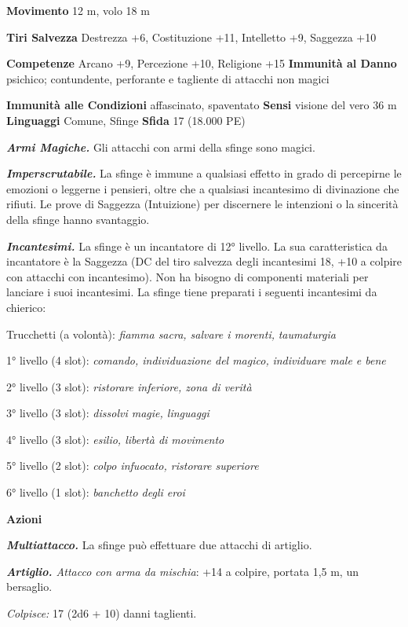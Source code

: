 \begin{multicols}{2}
\textbf{Movimento} 12 m, volo 18 m

\textbf{Tiri Salvezza} Destrezza +6, Costituzione +11, Intelletto +9,
Saggezza +10

\textbf{Competenze} Arcano +9, Percezione +10, Religione +15
\textbf{Immunità al Danno} psichico; contundente, perforante e tagliente
di attacchi non magici

\textbf{Immunità alle Condizioni} affascinato, spaventato \textbf{Sensi}
visione del vero 36 m \textbf{Linguaggi} Comune,
Sfinge \textbf{Sfida} 17 (18.000 PE)

\emph{\textbf{Armi Magiche.}} Gli attacchi con armi della sfinge sono
magici.

\emph{\textbf{Imperscrutabile.}} La sfinge è immune a qualsiasi effetto
in grado di percepirne le emozioni o leggerne i pensieri, oltre che a
qualsiasi incantesimo di divinazione che rifiuti. Le prove di Saggezza
(Intuizione) per discernere le intenzioni o la sincerità della sfinge
hanno svantaggio.

\emph{\textbf{Incantesimi.}} La sfinge è un incantatore di 12° livello.
La sua caratteristica da incantatore è la Saggezza (DC del tiro salvezza
degli incantesimi 18, +10 a colpire con attacchi con incantesimo). Non
ha bisogno di componenti materiali per lanciare i suoi incantesimi. La
sfinge tiene preparati i seguenti incantesimi da chierico:

Trucchetti (a volontà): \emph{fiamma sacra, salvare i morenti,}
\emph{taumaturgia}

1° livello (4 slot): \emph{comando, individuazione del magico,}
\emph{individuare male e bene}

2° livello (3 slot): \emph{ristorare inferiore, zona di verità}

3° livello (3 slot): \emph{dissolvi magie, linguaggi}

4° livello (3 slot): \emph{esilio, libertà di movimento}

5° livello (2 slot): \emph{colpo infuocato, ristorare superiore}

6° livello (1 slot): \emph{banchetto degli eroi}


\textbf{Azioni}

\emph{\textbf{Multiattacco.}} La sfinge può effettuare due attacchi di
artiglio.

\emph{\textbf{Artiglio.} Attacco con arma da mischia}: +14 a colpire,
portata 1,5 m, un bersaglio.

\emph{Colpisce:} 17 (2d6 + 10) danni taglienti.


\end{multicols}
